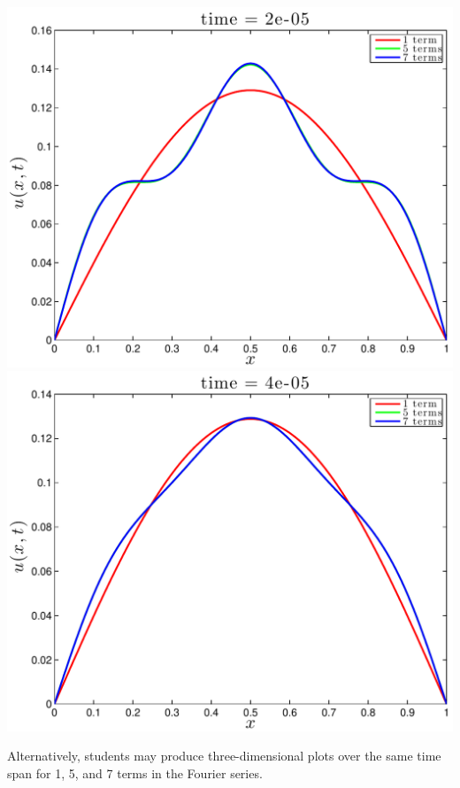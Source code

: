{\begin{solution}
\begin{enumerate}
\begin{center}
\includegraphics[scale=0.4]{fourth_c}
\includegraphics[scale=0.4]{fourth_d}
\end{center}
Alternatively, students may produce three-dimensional plots over the same time
span for 1, 5, and 7 terms in the Fourier series.


\end{enumerate}
\end{solution}}
